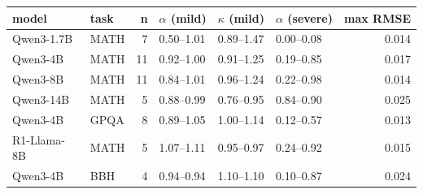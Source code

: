 \begin{tabular}{llrlllr}
\toprule
model & task & n & $\alpha$ (mild) & $\kappa$ (mild) & $\alpha$ (severe) & max RMSE \\
\midrule
Qwen3-1.7B & MATH & 7 & 0.50--1.01 & 0.89--1.47 & 0.00--0.08 & 0.014 \\
Qwen3-4B & MATH & 11 & 0.92--1.00 & 0.91--1.25 & 0.19--0.85 & 0.017 \\
Qwen3-8B & MATH & 11 & 0.84--1.01 & 0.96--1.24 & 0.22--0.98 & 0.014 \\
Qwen3-14B & MATH & 5 & 0.88--0.99 & 0.76--0.95 & 0.84--0.90 & 0.025 \\
Qwen3-4B & GPQA & 8 & 0.89--1.05 & 1.00--1.14 & 0.12--0.57 & 0.013 \\
R1-Llama-8B & MATH & 5 & 1.07--1.11 & 0.95--0.97 & 0.24--0.92 & 0.015 \\
Qwen3-4B & BBH & 4 & 0.94--0.94 & 1.10--1.10 & 0.10--0.87 & 0.024 \\
\bottomrule
\end{tabular}
